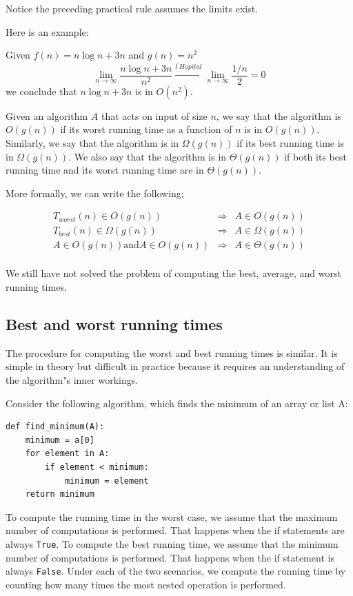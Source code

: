 \documentclass[justified, sixbynine]{tufte-book}
\def\ft{\small\tt}
\theoremstyle{plain}%
\newtheorem * {corollary}{Corollary}
\theoremstyle{definition}
\theoremstyle{remark}
\newtheorem * {remark}{Remark}
\newtheorem * {note}{Note}
\begin{document}
\begin{fullwidth}
Notice the preceding practical rule assumes the limits exist.

Here is an example:

Given $f(n) = n\log n+3n$ and $g(n) = n^2$
\begin{equation}
\lim_{n\rightarrow \infty }\frac{n\log n+3n}{n^2}\stackrel{l^{\prime }Hopital%
}{\longrightarrow }\lim_{n\rightarrow \infty }\frac{1/n}2=0
\end{equation}
we conclude that $n\log n+3n$ is in $O(n^2)$.



Given an algorithm $A$ that acts on input of size $n$, we say that the algorithm is $O(g(n))$ if its worst running time as a function of $n$ is in $O(g(n))$. Similarly, we say that the algorithm is in $\Omega(g(n))$ if its best running time is in $\Omega(g(n))$. We also say that the algorithm is in $ \Theta(g(n))$ if both its best running time and its worst running time are in  $\Theta(g(n))$.

More formally, we can write the following:

\begin{eqnarray}
T_{worst}(n) \in O(g(n)) &\Rightarrow& A \in O(g(n)) \\
T_{best}(n) \in \Omega(g(n)) &\Rightarrow& A \in \Omega(g(n)) \\
A \in O(g(n)) \textrm{and} A \in O(g(n))  &\Rightarrow& A \in \Theta(g(n)) \\
\end{eqnarray}

We still have not solved the problem of computing the best, average, and worst running times.

\goodbreak\subsection{Best and worst running times}

The procedure for computing the worst and best running times is similar. It is simple in theory but difficult in practice because it requires an understanding of the algorithm"s inner workings.

Consider the following algorithm, which finds the minimum of an array or list A:
\begin{lstlisting}
def find_minimum(A):
    minimum = a[0]
    for element in A:
        if element < minimum:
            minimum = element
    return minimum
\end{lstlisting}


To compute the running time in the worst case, we assume that the maximum number of computations is performed. That happens when the if statements are always {\ft True}. To compute the best running time, we assume that the minimum number of computations is performed. That happens when the if statement is always {\ft False}.
Under each of the two scenarios, we compute the running time by counting how many times the most nested operation is performed.


\end{fullwidth}
\end{document}
